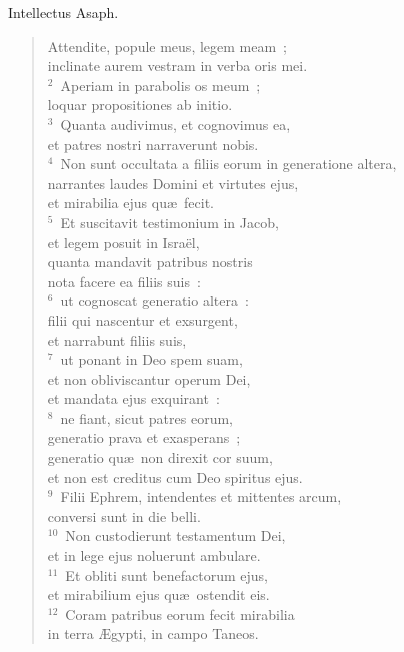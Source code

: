 \lettrine[lines=3,image=true,loversize=0.05,lraise=-0.03]{I}{}ntellectus Asaph. \begin{flushleft}\begin{verse}\vspace{6pt}Attendite, popule meus, legem meam~;\\ inclinate aurem vestram in verba oris mei.\\
${}^{2}$~Aperiam in parabolis os meum~;\\ loquar propositiones ab initio.\\
${}^{3}$~Quanta audivimus, et cognovimus ea,\\ et patres nostri narraverunt nobis.\\
${}^{4}$~Non sunt occultata a filiis eorum in generatione altera,\\ narrantes laudes Domini et virtutes ejus,\\ et mirabilia ejus qu\ae\ fecit.\\
${}^{5}$~Et suscitavit testimonium in Jacob,\\ et legem posuit in Isra\"el,\\ quanta mandavit patribus nostris\\ nota facere ea filiis suis~:\\
${}^{6}$~ut cognoscat generatio altera~:\\ filii qui nascentur et exsurgent,\\ et narrabunt filiis suis,\\
${}^{7}$~ut ponant in Deo spem suam,\\ et non obliviscantur operum Dei,\\ et mandata ejus exquirant~:\\
${}^{8}$~ne fiant, sicut patres eorum,\\ generatio prava et exasperans~;\\ generatio qu\ae\ non direxit cor suum,\\ et non est creditus cum Deo spiritus ejus.\\
${}^{9}$~Filii Ephrem, intendentes et mittentes arcum,\\ conversi sunt in die belli.\\
${}^{10}$~Non custodierunt testamentum Dei,\\ et in lege ejus noluerunt ambulare.\\
${}^{11}$~Et obliti sunt benefactorum ejus,\\ et mirabilium ejus qu\ae\ ostendit eis.\\
${}^{12}$~Coram patribus eorum fecit mirabilia\\ in terra \AE gypti, in campo Taneos.\\

\end{verse}
\end{flushleft}
